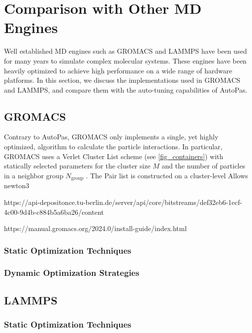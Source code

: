 \documentclass[conference]{IEEEtran}
\begin{document}
\section{Comparison with Other MD Engines}

Well established MD engines such as GROMACS and LAMMPS have been used for many years to simulate complex molecular systems. These engines have been heavily optimized to achieve high performance on a wide range of hardware platforms. In this section, we discuss the implementations used in GROMACS and LAMMPS, and compare them with the auto-tuning capabilities of AutoPas.


\subsection{GROMACS}

Contrary to AutoPas, GROMACS only implements a single, yet highly optimized, algorithm to calculate the particle interactions. In particular, GROMACS uses a Verlet Cluster List scheme (see \autoref{fig_containers}) with statically selected parameters for the cluster size $M$ and the number of particles in a neighbor group $N_{\text{group}}$ \cite{PALL20132641}.
The Pair list is constructed on a cluster-level
Allows newton3



https://api-depositonce.tu-berlin.de/server/api/core/bitstreams/def32eb6-1ecf-4c00-9d4b-c884b5a6ba26/content

https://manual.gromacs.org/2024.0/install-guide/index.html

\subsubsection{Static Optimization Techniques}


\subsubsection{Dynamic Optimization Strategies}




\subsection{LAMMPS}

\subsubsection{Static Optimization Techniques}
\end{document}

